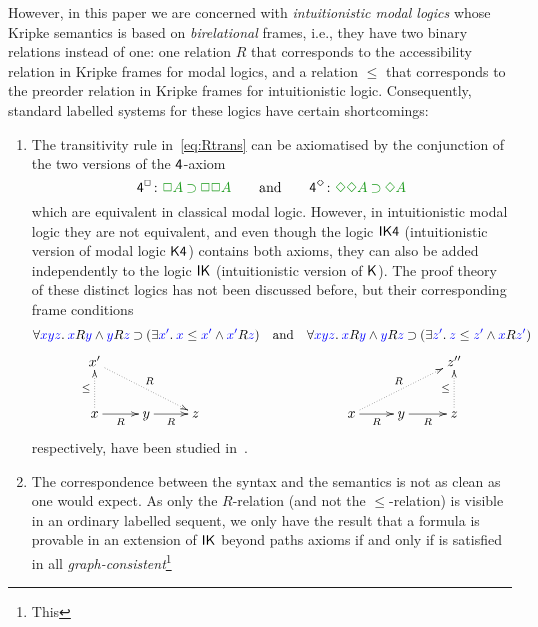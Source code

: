 However,
in this paper we are concerned with \emph{intuitionistic modal
logics} whose Kripke semantics is based on \emph{birelational}
frames, i.e., they have two binary relations instead of one: one
relation $R$ that corresponds to the accessibility relation in 
Kripke frames for modal logics, and a relation $\le$ that
corresponds to the preorder relation in Kripke frames for
intuitionistic logic. Consequently, standard labelled systems for
these logics have certain shortcomings:
\begin{enumerate}
	\item The transitivity rule in~\eqref{eq:Rtrans} can be axiomatised by the conjunction of the two
	versions of the $\mathsf{4}$-axiom
	\begin{equation}
	\label{eq:4ax}
	\ax{4^{\BOX}}\colon\fm{\BOX A\IMP \BOX\BOX A}
	\qquand
	\rn{4^{\DIA}}\colon\fm{\DIA\DIA A\IMP\DIA A}
	\end{equation}
	which are equivalent in classical
	modal logic. However, in intuitionistic modal logic they are not
	equivalent, and even though the logic $\mathsf{IK4}$ 
	(intuitionistic version of modal logic $\mathsf{K4}$) contains both
	axioms, they can also be added independently to the logic $\mathsf{IK}$ 
	(intuitionistic version of $\mathsf{K}$). The proof theory of these
	distinct logics has not been discussed before, but their
	corresponding frame conditions
	\begin{equation}
	\label{eq:4frame}
	\forall{\color{blue}{xyz}}.\:{\color{blue}{x}}R{\color{blue}{y}}\mathbin{\wedge} {\color{blue}{y}}R{\color{blue}{z}}\mathbin{\supset}(\exists{\color{blue}{x'}}.\:{\color{blue}{x}}\le{{\color{blue}{x'}}}\mathbin{\wedge}{\color{blue}{x'}}R{\color{blue}{z}})
	\quad\mbox{and}\quad
	\forall{\color{blue}{xyz}}.\:{\color{blue}{x}}R{\color{blue}{y}}\mathbin{\wedge} {\color{blue}{y}}R{\color{blue}{z}}\mathbin{\supset}(\exists{\color{blue}{z'}}.\:{\color{blue}{z}}\le{{\color{blue}{z'}}}\mathbin{\wedge}{\color{blue}{x}}R{\color{blue}{z'}})
	\;
	\end{equation}
	$$
	\xymatrix{
		x' \ar@{.>}[drr]^R \\
		x \ar@{.>}[u]^\le \ar@{->}[r]_{R} & y \ar@{->}[r]_{R} & z
	}
	\hskip10em
	\xymatrix{
		&& z''  \\
		x  \ar@{.>}[urr]^R \ar@{->}[r]_{R} & y \ar@{->}[r]_{R} & z \ar@{.>}[u]^\le
	}
	$$
	respectively, have been studied in~\cite{plotkin:stirling:86}.
	\item The correspondence between the syntax and the semantics is not
	as clean as one would expect. As only the $R$-relation (and not the
	$\le$-relation) is visible in an ordinary labelled
	sequent, we only have the result that a formula is provable in an extension of $\mathsf{IK}$ beyond paths axioms 
	if and only if is satisfied in all \emph{graph-consistent}\footnote{This
}
\end{enumerate}

